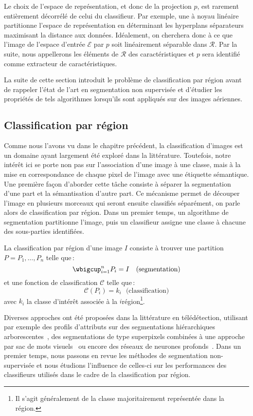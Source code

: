 Le choix de l'espace de représentation, et donc de la projection $p$, est rarement entièrement décorrélé de celui du classifieur. Par exemple, une  à noyau linéaire partitionne l'espace de représentation en déterminant les hyperplans séparateurs maximisant la distance aux données. Idéalement, on cherchera donc à ce que l'image de l'espace d'entrée $\mathcal{E}$ par $p$ soit linéairement séparable dans $\mathcal{R}$. Par la suite, nous appellerons les éléments de $\mathcal{R}$ des caractéristiques et $p$ sera identifié comme extracteur de caractéristiques.

La suite de cette section introduit le problème de classification par région avant de rappeler l'état de l'art en segmentation non supervisée et d'étudier les propriétés de tels algorithmes lorsqu'ils sont appliqués sur des images aériennes.

\subsection{Classification par région}

Comme nous l'avons vu dans le chapitre précédent, la classification d'images est un domaine ayant largement été exploré dans la littérature. Toutefois, notre intérêt ici se porte non pas sur l'association d'une image à une classe, mais à la mise en correspondance de chaque pixel de l'image avec une étiquette sémantique. Une première façon d'aborder cette tâche consiste à séparer la segmentation d'une part et la sémantisation d'autre part. Ce mécanisme permet de découper l'image en plusieurs morceaux qui seront ensuite classifiés séparément, on parle alors de classification par région. Dans un premier temps, un algorithme de segmentation partitionne l'image, puis un classifieur assigne une classe à chacune des sous-parties identifiées.
\begin{definition}
La classification par région d'une image $I$ consiste à trouver une partition $P = {P_1, \dots, P_n}$ telle que\,:
$$\wbigcup_{i=1}^n P_i = I~~~\text{(segmentation)}$$
et une fonction de classification $\mathcal{C}$ telle que\,:
$$\mathcal{C}(P_i) = k_i~~~\text{(classification)}$$
avec $k_i$ la classe d'intérêt associée à la $i$\ieme région\footnote{Il s'agit généralement de la classe majoritairement représentée dans la région.}.
\end{definition}

Diverses approches ont été proposées dans la littérature en télédétection, utilisant par exemple des profils d'attributs sur des segmentations hiérarchiques arborescentes~\cite{bosilj_indexation_2016}, des segmentations de type superpixels combinées à une approche par sac de mots visuels~\cite{li_superpixel-based_2018} ou encore des réseaux de neurones profonds~\cite{gong_superpixel-based_2017}. Dans un premier temps, nous passons en revue les méthodes de segmentation non-supervisée et nous étudions l'influence de celles-ci sur les performances des classifieurs utilisés dans le cadre de la classification par région.

